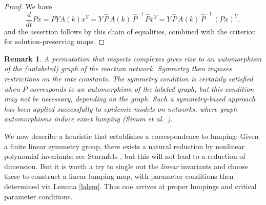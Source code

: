 \documentclass{article}
\newtheorem{remark}{Remark}
\begin{document}
\begin{proof} We have 
\[
\frac d{dt} Px=PYA(k)x^Y=Y\,\widehat P\,A(k)\,{\widehat P}^{-1}\,\widehat Px^Y=Y\,\widehat P\,A(k)\,{\widehat P}^{-1}\,(Px)^Y,
\]
and the assertion follows by this chain of equalities, combined with the criterion for solution-preserving maps.
\end{proof}
\begin{remark}{\em  
    A permutation that respects complexes gives rise to an automorphism of the (unlabeled) graph of the reaction network. Symmetry then imposes restrictions on the rate constants.
The symmetry condition is certainly satisfied when $P$ corresponds to an automorphism of the labeled graph, but this condition may not be necessary, depending on the graph. Such a symmetry-based approach has been applied successfully to epidemic models on networks, 
where graph automorphisms induce exact lumping (Simon et al.\ \cite{SimonTaylorKiss2011}).}
\end{remark}
We now describe a heuristic that establishes a correspondence to lumping: Given a finite linear symmetry group, there exists a natural reduction by nonlinear polynomial invariants; see Sturmfels \cite{Sturm}, but this will not lead to a reduction of dimension. But it is worth a try to single out the {\em linear} invariants and choose these to construct a linear lumping map, with parameter conditions then determined via Lemma \ref{lalem}. Thus one arrives at proper lumpings and critical parameter conditions.
\end{document}
